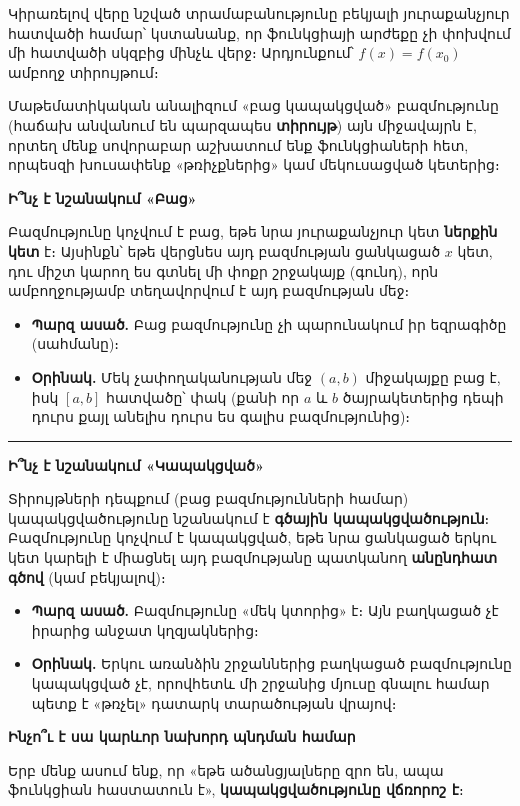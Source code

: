 \documentclass[12pt, a4paper]{article}
\begin{document}
Կիրառելով վերը նշված տրամաբանությունը բեկյալի յուրաքանչյուր հատվածի համար՝ կստանանք, որ ֆունկցիայի արժեքը չի փոխվում մի հատվածի սկզբից մինչև վերջ։ Արդյունքում՝ $f(x) = f(x_0)$ ամբողջ տիրույթում։

Մաթեմատիկական անալիզում «բաց կապակցված» բազմությունը (հաճախ անվանում են պարզապես \textbf{տիրույթ}) այն միջավայրն է, որտեղ մենք սովորաբար աշխատում ենք ֆունկցիաների հետ, որպեսզի խուսափենք «թռիչքներից» կամ մեկուսացված կետերից։

\textbf{Ի՞նչ է նշանակում «Բաց»}

Բազմությունը կոչվում է բաց, եթե նրա յուրաքանչյուր կետ \textbf{ներքին կետ} է։
Այսինքն՝ եթե վերցնես այդ բազմության ցանկացած $x$ կետ, դու միշտ կարող ես գտնել մի փոքր շրջակայք (գունդ), որն ամբողջությամբ տեղավորվում է այդ բազմության մեջ։

\begin{itemize}
    \item \textbf{Պարզ ասած.} Բաց բազմությունը չի պարունակում իր եզրագիծը (սահմանը)։
    \item \textbf{Օրինակ.} Մեկ չափողականության մեջ $(a, b)$ միջակայքը բաց է, իսկ $[a, b]$ հատվածը՝ փակ (քանի որ $a$ և $b$ ծայրակետերից դեպի դուրս քայլ անելիս դուրս ես գալիս բազմությունից)։
\end{itemize}

\vspace{1em}
\hrule
\vspace{1em}

\textbf{Ի՞նչ է նշանակում «Կապակցված»}

Տիրույթների դեպքում (բաց բազմությունների համար) կապակցվածությունը նշանակում է \textbf{գծային կապակցվածություն}։
Բազմությունը կոչվում է կապակցված, եթե նրա ցանկացած երկու կետ կարելի է միացնել այդ բազմությանը պատկանող \textbf{անընդհատ գծով} (կամ բեկյալով)։

\begin{itemize}
    \item \textbf{Պարզ ասած.} Բազմությունը «մեկ կտորից» է։ Այն բաղկացած չէ իրարից անջատ կղզյակներից։
    \item \textbf{Օրինակ.} Երկու առանձին շրջաններից բաղկացած բազմությունը կապակցված չէ, որովհետև մի շրջանից մյուսը գնալու համար պետք է «թռչել» դատարկ տարածության վրայով։
\end{itemize}

\textbf{Ինչո՞ւ է սա կարևոր նախորդ պնդման համար}

Երբ մենք ասում ենք, որ «եթե ածանցյալները զրո են, ապա ֆունկցիան հաստատուն է», \textbf{կապակցվածությունը վճռորոշ է}։
\end{document}

